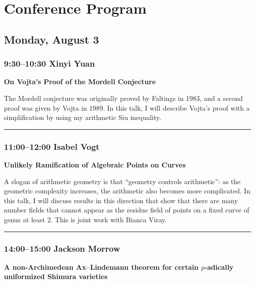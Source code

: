 \documentclass[11pt]{amsart}
\numberwithin{equation}{section}
\begin{document}
\section*{Conference Program}

\subsection*{Monday, August 3}

\subsubsection*{9:30--10:30 \quad Xinyi Yuan}

\textbf{On Vojta's Proof of the Mordell Conjecture}

The Mordell conjecture was originally proved by Faltings in 1983, and a second proof was given by Vojta in 1989. In this talk, I will describe Vojta's proof with a simplification by using my arithmetic Siu inequality.

\bigskip
\hrule
\bigskip

\subsubsection*{11:00--12:00 \quad Isabel Vogt}

\textbf{Unlikely Ramification of Algebraic Points on Curves}

A slogan of arithmetic geometry is that ``geometry controls arithmetic'': as the geometric complexity increases, the arithmetic also becomes more complicated. In this talk, I will discuss results in this direction that show that there are many number fields that cannot appear as the residue field of points on a fixed curve of genus at least 2. This is joint work with Bianca Viray.

\bigskip
\hrule
\bigskip

\subsubsection*{14:00--15:00 \quad Jackson Morrow}

\textbf{A non-Archimedean Ax--Lindemann theorem for certain $p$-adically uniformized Shimura varieties}
\end{document}
